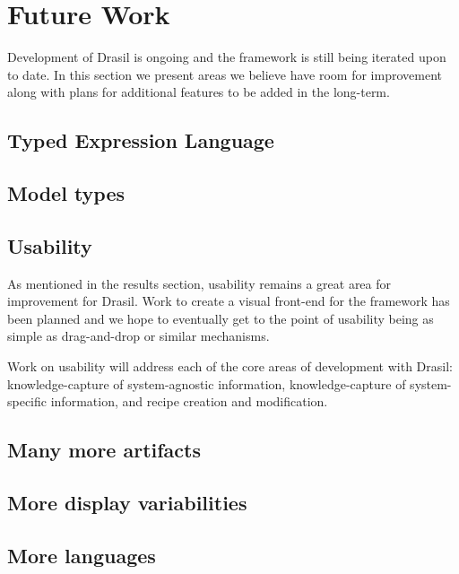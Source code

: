 
\chapter{Future Work}
Development of Drasil is ongoing and the framework is still being iterated upon
to date. In this section we present areas we believe have room for improvement
along with plans for additional features to be added in the long-term.

\section{Typed Expression Language}

\section{Model types}
\section{Usability}
As mentioned in the results section, usability remains a great area for
improvement for Drasil. Work to create a visual front-end for the framework
has been planned and we hope to eventually get to the point of usability being
as simple as drag-and-drop or similar mechanisms.

Work on usability will address each of the core areas of development with
Drasil: knowledge-capture of system-agnostic information,
knowledge-capture of system-specific information, and recipe creation and
modification.
\section{Many more artifacts}
\section{More display variabilities}
\section{More languages}

